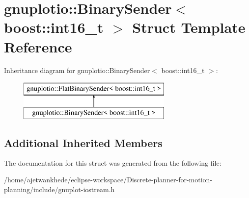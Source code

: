 \hypertarget{structgnuplotio_1_1BinarySender_3_01boost_1_1int16__t_01_4}{}\section{gnuplotio\+:\+:Binary\+Sender$<$ boost\+:\+:int16\+\_\+t $>$ Struct Template Reference}
\label{structgnuplotio_1_1BinarySender_3_01boost_1_1int16__t_01_4}
Inheritance diagram for gnuplotio\+:\+:Binary\+Sender$<$ boost\+:\+:int16\+\_\+t $>$\+:\begin{figure}[H]
\begin{center}
\leavevmode
\includegraphics[height=2.000000cm]{structgnuplotio_1_1BinarySender_3_01boost_1_1int16__t_01_4}
\end{center}
\end{figure}
\subsection*{Additional Inherited Members}


The documentation for this struct was generated from the following file\+:\begin{DoxyCompactItemize}
\item 
/home/ajetwankhede/eclipse-\/workspace/\+Discrete-\/planner-\/for-\/motion-\/planning/include/gnuplot-\/iostream.\+h\end{DoxyCompactItemize}
